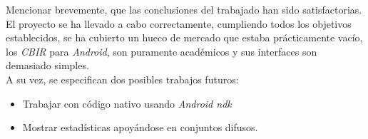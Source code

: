 Mencionar brevemente, que las conclusiones del trabajado han sido satisfactorias. El proyecto se ha llevado a cabo correctamente, cumpliendo todos los objetivos establecidos, se ha cubierto un hueco de mercado que estaba prácticamente vacío, los \textit{CBIR} para \textit{Android}, son puramente académicos y sus interfaces son demasiado simples.\\

A su vez, se especifican dos posibles trabajos futuros:

\begin{itemize}

\item Trabajar con código nativo usando \textit{Android ndk}

\item Mostrar estadísticas apoyándose en conjuntos difusos.

\end{itemize}

